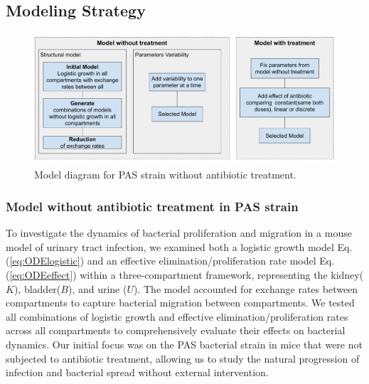 \documentclass{article}
\begin{document}
\subsection{Modeling Strategy}
\begin{figure}
	\centering
	\includegraphics[width=0.8\linewidth]{images/anoruti_model_strategy.pdf}
	\caption{Model diagram for PAS strain without antibiotic treatment. }
	\label{fig:ModelingStrategy}
\end{figure}

\subsubsection{Model without antibiotic treatment in PAS strain}

To investigate the dynamics of bacterial proliferation and migration in a mouse model of urinary tract infection, we examined both a logistic growth model Eq. (\ref{eq:ODElogistic}) and an effective elimination/proliferation rate model Eq. (\ref{eq:ODEeffect}) within a three-compartment framework, representing the kidney($K$), bladder($B$), and urine ($U$). 
%
The model accounted for exchange rates between compartments to capture bacterial migration between compartments.
%
We tested all combinations of logistic growth and effective elimination/proliferation rates across all compartments to comprehensively evaluate their effects on bacterial dynamics.
%
Our initial focus was on the PAS bacterial strain in mice that were not subjected to antibiotic treatment, allowing us to study the natural progression of infection and bacterial spread without external intervention.

\end{document}
